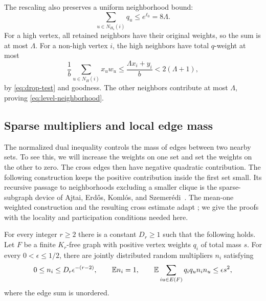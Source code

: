 The rescaling also preserves a uniform neighborhood bound:
\begin{equation}
\label{eq:level-neighborhood}
 \sum_{u\in N_{H_b}(i)}q_u\le e^{\ell_0}=8\Lambda.
\end{equation}
For a high vertex, all retained neighbors have their original weights,
so the sum is at most $\Lambda$.  For a non-high vertex $i$, the high
neighbors have total $q$-weight at most
\[
 \frac1b\sum_{u\in N_H(i)}x_uw_u
 \le\frac{\Lambda x_i+y_i}{b}<2(\Lambda+1),
\]
by \eqref{eq:drop-test} and goodness.  The other neighbors contribute
at most $\Lambda$, proving \eqref{eq:level-neighborhood}.

\subsection{Sparse multipliers and local edge mass}

The normalized dual inequality controls the mass of edges between two
nearby sets.  To see this, we will increase the weights on one set and
set the weights on the other to zero.  The cross edges then have
negative quadratic contribution.  The following construction keeps the
positive contribution inside the first set small.  Its recursive passage
to neighborhoods excluding a smaller clique is the sparse-subgraph
device of Ajtai, Erd\H{o}s, Koml\'os, and
Szemer\'edi~\cite[Section~3]{AEKS1981}.  The mean-one weighted
construction and the resulting cross estimate adapt
\cite[Lemmas~2.2--2.3]{OpenAIIndependence}; we give the proofs with the
locality and participation conditions needed here.

\begin{lemma}
\label{lem:sparse-multipliers}
For every integer $r\ge2$ there is a constant $D_r\ge1$ such that the
following holds.  Let $F$ be a finite $K_r$-free graph with positive
vertex weights $q_i$ of total mass $s$.  For every
$0<\epsilon\le1/2$, there are jointly distributed random multipliers
$n_i$ satisfying
\begin{equation}
\label{eq:sparse-multipliers}
 0\le n_i\le D_r\epsilon^{-(r-2)},\qquad
 \mathbb E n_i=1,\qquad
 \mathbb E\sum_{iu\in E(F)}q_iq_u n_i n_u\le\epsilon s^2,
\end{equation}
where the edge sum is unordered.
\end{lemma}

